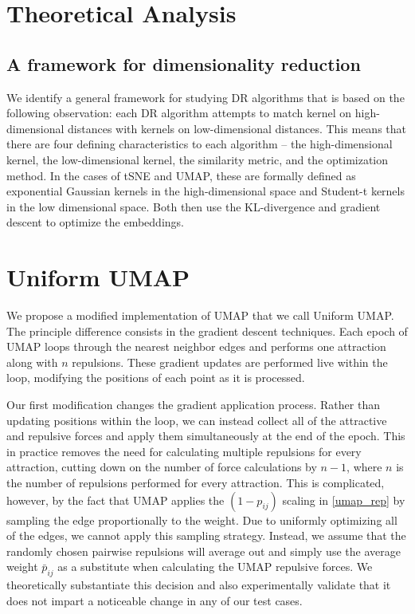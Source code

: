 \documentclass{article}
\theoremstyle{definition}
\begin{document}
\begin{multicols}{2}
\section{Theoretical Analysis} \label{analysis}
\subsection{A framework for dimensionality reduction}
We identify a general framework for studying DR algorithms that is based on the following observation: each DR
algorithm attempts to match kernel on high-dimensional distances with kernels on low-dimensional distances. This means that there are four defining
characteristics to each algorithm -- the high-dimensional kernel, the low-dimensional kernel, the similarity metric, and the optimization method. In the cases of tSNE and UMAP, these
are formally defined as exponential Gaussian kernels in the high-dimensional space and Student-t kernels in the low dimensional space. Both then use the
KL-divergence and gradient descent to optimize the embeddings.

\section{Uniform UMAP} \label{uniform}
We propose a modified implementation of UMAP that we call Uniform UMAP. The principle difference consists in the gradient descent techniques. Each epoch of
UMAP loops through the nearest neighbor edges and performs one attraction along with $n$ repulsions. These gradient updates are performed live within the loop,
modifying the positions of each point as it is processed.

Our first modification changes the gradient application process. Rather than updating positions within the loop, we can instead collect all of the
attractive and repulsive forces and apply them simultaneously at the end of the epoch. This in practice removes the need for calculating multiple repulsions
for every attraction, cutting down on the number of force calculations by $n-1$, where $n$ is the number of repulsions performed for every attraction. This is
complicated, however, by the fact that UMAP applies the $(1 - p_{ij})$ scaling in \ref{umap_rep} by sampling the edge proportionally to the weight. Due to
uniformly optimizing all of the edges, we cannot apply this sampling strategy. Instead, we assume that the randomly chosen pairwise repulsions will average out
and simply use the average weight $\bar{p}_{ij}$ as a substitute when calculating the UMAP repulsive forces. We theoretically substantiate this decision and
also experimentally validate that it does not impart a noticeable change in any of our test cases.


\end{multicols}
\end{document}
